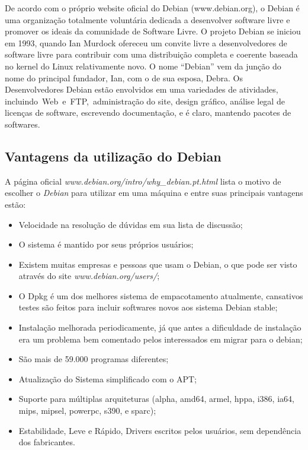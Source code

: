 De acordo com o próprio website oficial do Debian (www.debian.org), o Debian é uma organização totalmente voluntária dedicada a desenvolver software livre e promover os ideais da comunidade de Software Livre. O projeto Debian se iniciou em 1993, quando Ian Murdock ofereceu um convite livre a desenvolvedores de software livre para contribuir com uma distribuição completa e coerente baseada no kernel do Linux relativamente novo. O nome “Debian” vem da junção do nome do principal fundador, Ian, com o de sua esposa, Debra. Os Desenvolvedores Debian estão envolvidos em uma variedades de atividades, incluindo Web e FTP, administração do site, design gráfico, análise legal de licenças de software, escrevendo documentação, e é claro, mantendo pacotes de softwares.

\subsection{Vantagens da utilização do Debian}
A página oficial \textit{www.debian.org/intro/why\_debian.pt.html} lista o motivo de escolher o \textit{Debian} para utilizar em uma máquina e entre suas principais vantagens estão:

\begin{itemize}
	\item Velocidade na resolução de dúvidas em sua lista de discussão;
	\item O sistema é mantido por seus próprios usuários;
	\item Existem muitas empresas e pessoas que usam o Debian, o que pode ser visto através do site \textit{www.debian.org/users/};
	\item O Dpkg é um dos melhores sistema de empacotamento atualmente, cansativos testes são feitos para incluir softwares novos aos sistema Debian stable;
	\item Instalação melhorada periodicamente, já que antes a dificuldade de instalação era um problema bem comentado pelos interessados em migrar para o debian;
	\item São mais de 59.000 programas diferentes;
	\item Atualização do Sistema simplificado com o APT;
	\item Suporte para múltiplas arquiteturas (alpha, amd64, armel, hppa, i386, ia64, mips, mipsel, powerpc, s390, e sparc);
	\item Estabilidade, Leve e Rápido, Drivers escritos pelos usuários, sem dependência dos fabricantes.
\end{itemize}

